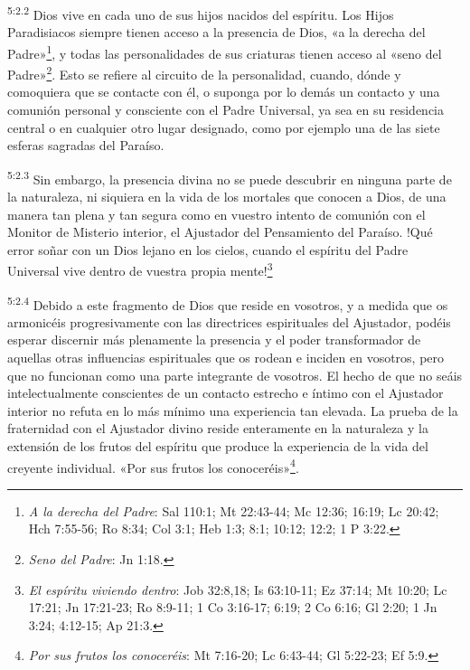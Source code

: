 \par
\textsuperscript{5:2.2} Dios vive en cada uno de sus hijos nacidos del espíritu. Los Hijos Paradisiacos siempre tienen acceso a la presencia de Dios, «a la derecha del Padre»\footnote{\textit{A la derecha del Padre}: Sal 110:1; Mt 22:43-44; Mc 12:36; 16:19; Lc 20:42; Hch 7:55-56; Ro 8:34; Col 3:1; Heb 1:3; 8:1; 10:12; 12:2; 1 P 3:22.}, y todas las personalidades de sus criaturas tienen acceso al «seno del Padre»\footnote{\textit{Seno del Padre}: Jn 1:18.}. Esto se refiere al circuito de la personalidad, cuando, dónde y comoquiera que se contacte con él, o suponga por lo demás un contacto y una comunión personal y consciente con el Padre Universal, ya sea en su residencia central o en cualquier otro lugar designado, como por ejemplo una de las siete esferas sagradas del Paraíso.

\par
\textsuperscript{5:2.3} Sin embargo, la presencia divina no se puede descubrir en ninguna parte de la naturaleza, ni siquiera en la vida de los mortales que conocen a Dios, de una manera tan plena y tan segura como en vuestro intento de comunión con el Monitor de Misterio interior, el Ajustador del Pensamiento del Paraíso. !Qué error soñar con un Dios lejano en los cielos, cuando el espíritu del Padre Universal vive dentro de vuestra propia mente!\footnote{\textit{El espíritu viviendo dentro}: Job 32:8,18; Is 63:10-11; Ez 37:14; Mt 10:20; Lc 17:21; Jn 17:21-23; Ro 8:9-11; 1 Co 3:16-17; 6:19; 2 Co 6:16; Gl 2:20; 1 Jn 3:24; 4:12-15; Ap 21:3.}

\par
\textsuperscript{5:2.4} Debido a este fragmento de Dios que reside en vosotros, y a medida que os armonicéis progresivamente con las directrices espirituales del Ajustador, podéis esperar discernir más plenamente la presencia y el poder transformador de aquellas otras influencias espirituales que os rodean e inciden en vosotros, pero que no funcionan como una parte integrante de vosotros. El hecho de que no seáis intelectualmente conscientes de un contacto estrecho e íntimo con el Ajustador interior no refuta en lo más mínimo una experiencia tan elevada. La prueba de la fraternidad con el Ajustador divino reside enteramente en la naturaleza y la extensión de los frutos del espíritu que produce la experiencia de la vida del creyente individual. «Por sus frutos los conoceréis»\footnote{\textit{Por sus frutos los conoceréis}: Mt 7:16-20; Lc 6:43-44; Gl 5:22-23; Ef 5:9.}.

